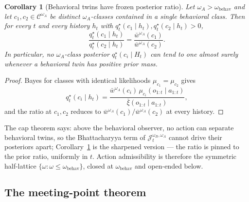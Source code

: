 \documentclass[11pt]{article}
\newtheorem{corollary}[theorem]{Corollary}
\theoremstyle{definition}
\theoremstyle{remark}
\newcommand{\Ccal}{\mathcal{C}}
\newcommand{\barxi}{\bar{\xi}}
\begin{document}
\begin{corollary}[Behavioral twins have frozen posterior ratio]
\label{cor:twins-frozen-ratio}
Let $\omega_A>\omega_{\mathrm{behav}}$ and let $c_1,c_2\in\Ccal^{\omega_A}$ be distinct $\omega_A$-classes contained in a single behavioral class. Then for every $t$ and every history $h_t$ with $q_t^\star(c_1\mid h_t),q_t^\star(c_2\mid h_t)>0$,
\[
\frac{q_t^\star(c_1\mid h_t)}{q_t^\star(c_2\mid h_t)}=\frac{\bar w^{\omega_A}(c_1)}{\bar w^{\omega_A}(c_2)}.
\]
In particular, no $\omega_A$-class posterior $q_t^\star(c_i\mid H_t)$ can tend to one almost surely whenever a behavioral twin has positive prior mass.
\end{corollary}

\begin{proof}
Bayes for classes with identical likelihoods $\mu_{c_1}=\mu_{c_2}$ gives
\[
q_t^\star(c_i\mid h_t)=\frac{\bar w^{\omega_A}(c_i)\,\mu_{c_i}(o_{1:t}\mid a_{1:t})}{\barxi(o_{1:t}\mid a_{1:t})},
\]
and the ratio at $c_1,c_2$ reduces to $\bar w^{\omega_A}(c_1)/\bar w^{\omega_A}(c_2)$ at every history.
\end{proof}

The cap theorem says: above the behavioral observer, no action can separate behavioral twins, so the Bhattacharyya term of $\mathcal J_t^{\omega_B,\omega_A}$ cannot drive their posteriors apart; Corollary~\ref{cor:twins-frozen-ratio} is the sharpened version --- the ratio is pinned to the prior ratio, uniformly in $t$. Action admissibility is therefore the symmetric half-lattice $\{\omega:\omega\le\omega_{\mathrm{behav}}\}$, closed at $\omega_{\mathrm{behav}}$ and open-ended below.

\subsection{The meeting-point theorem}
\label{sec:meeting-point}
\end{document}
